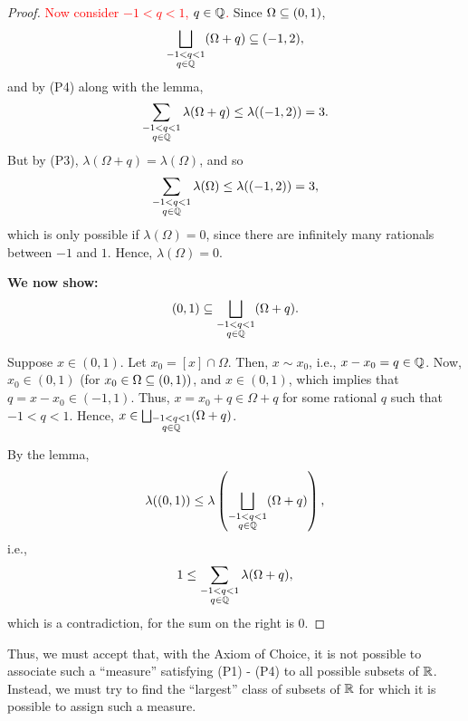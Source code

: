 \begin{proof}
\textcolor{red}{Now consider $-1 < q < 1$, $q \in \mathbb{Q}$.} Since $\Omega \subseteq (0, 1)$, 
\[ \bigsqcup_{\substack{-1 < q < 1 \\ q \in \mathbb{Q}}}(\Omega + q) \subseteq (-1, 2), \]
and by (P4) along with the lemma, 
\[ \sum_{\substack{-1 < q < 1 \\ q \in \mathbb{Q}} } \lambda(\Omega + q) \leq \lambda((-1, 2)) = 3 .\]
But by (P3), $\lambda(\Omega + q) = \lambda(\Omega)$, and so
\[ \sum_{\substack{-1 < q < 1 \\ q \in \mathbb{Q}} } \lambda(\Omega) \leq \lambda((-1, 2)) = 3, \]
which is only possible if $\lambda(\Omega) = 0$, since there are infinitely many rationals between $-1$ and $1$. Hence, $\lambda(\Omega) = 0$.

\textbf{We now show: }
\textcolor{red}{
\[ (0, 1) \subseteq \bigsqcup_{\substack{-1 < q < 1 \\ q \in \mathbb{Q}}}(\Omega + q). \]}

Suppose $x \in (0, 1)$. Let $x_0 = [x] \cap \Omega$. Then, $x  \sim x_0$, i.e., $x - x_0 = q \in \mathbb{Q}$. Now, $x_0 \in (0, 1)$ (for $x_0 \in \Omega \subseteq (0, 1))$, and $x \in (0, 1)$, which implies that $q = x - x_0 \in (-1, 1)$. Thus, $x = x_0 + q \in \Omega + q$ for some rational $q$ such that $-1 < q < 1$. Hence, $x \in \bigsqcup_{\substack{-1 < q < 1 \\ q \in \mathbb{Q}}}(\Omega + q)$.

By the lemma, 
\[ \lambda((0, 1)) \leq \lambda \left( \bigsqcup_{\substack{-1 < q < 1 \\ q \in \mathbb{Q}}}(\Omega + q) \right), \]
i.e., 
\[ 1 \leq \sum_{\substack{-1 < q < 1 \\ q \in \mathbb{Q}}} \lambda(\Omega + q), \]
which is a contradiction, for the sum on the right is $0$. 
\end{proof}

Thus, we must accept that, with the Axiom of Choice, it is not possible to associate such a ``measure'' satisfying (P1) - (P4) to all possible subsets of $\mathbb{R}$. Instead, we must try to find the ``largest'' class of subsets of $\mathbb{R}$ for which it is possible to assign such a measure. 